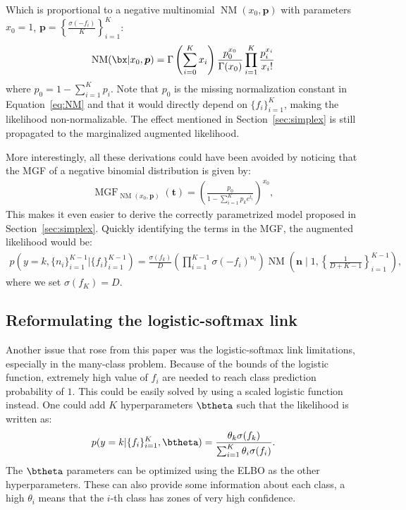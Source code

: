Which is proportional to a negative multinomial $\operatorname{NM}(x_0, \boldsymbol{p})$ with parameters $x_0=1$, $\boldsymbol{p}=\left\{\frac{\sigma(-f_i)}{K}\right\}_{i=1}^K$:
\begin{align*}
    \operatorname{NM}(\bx|x_0,\boldsymbol{p}) = \Gamma\left(\sum_{i=0}^K x_i\right) \frac{p_0^{x_0}}{\Gamma(x_0)}\prod_{i=1}^K \frac{p_i^{x_i}}{x_i!}   
\end{align*}
where $p_0 = 1 - \sum_{i=1}^K p_i$.
Note that $p_0$ is the missing normalization constant in Equation~\ref{eq:NM} and that it would directly depend on $\{f_i\}_{i=1}^K$, making the likelihood non-normalizable.
The effect mentioned in Section~\ref{sec:simplex} is still propagated to the marginalized augmented likelihood.

More interestingly, all these derivations could have been avoided by noticing that the \ac{MGF} of a negative binomial distribution is given by:
\begin{align*}
    \operatorname{MGF}_{\operatorname{NM}(x_0,\boldsymbol{p})}(\boldsymbol{t}) = \left(\frac{p_0}{1-\sum_{i=1}^K p_k e^{t_i}}\right)^{x_0},
\end{align*}
This makes it even easier to derive the correctly parametrized model proposed in Section~\ref{sec:simplex}.
Quickly identifying the terms in the \ac{MGF}, the augmented likelihood would be:
\begin{align*}
    p\left(y=k,\{n_i\}_{i=1}^{K-1}|\{f_i\}_{i=1}^{K-1}\right) = \frac{\sigma(f_k)}{D}\left(\prod_{i=1}^{K-1}\sigma(-f_i)^{n_i}\right)\operatorname{NM}\left(\boldsymbol{n}\mid 1, \left\{\frac{1}{D+K-1}\right\}_{i=1}^{K-1}\right),
\end{align*}
where we set $\sigma(f_K) = D$.

\subsection{Reformulating the logistic-softmax link}

Another issue that rose from this paper was the logistic-softmax link limitations, especially in the many-class problem.
Because of the bounds of the logistic function, extremely high value of $f_i$ are needed to reach class prediction probability of $1$.
This could be easily solved by using a scaled logistic function instead.
One could add $K$ hyperparameters $\btheta$ such that the likelihood is written as:
\begin{align*}
    p(y=k|\{f_i\}_{i=1}^K,\btheta) = \frac{\theta_k \sigma(f_k)}{\sum_{i=1}^K \theta_i \sigma(f_i)}.
\end{align*}
The $\btheta$ parameters can be optimized using the \ac{ELBO} as the other hyperparameters.
These can also provide some information about each class, a high $\theta_i$ means that the $i$-th class has zones of very high confidence.


